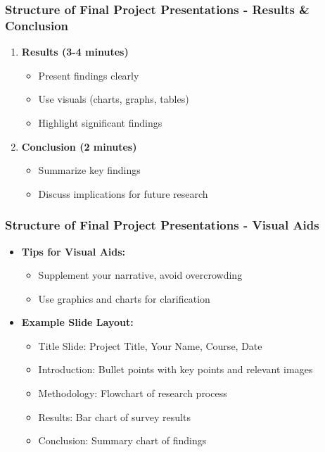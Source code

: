 \documentclass[aspectratio=169]{beamer}
\begin{document}
\begin{frame}[fragile]
    \frametitle{Structure of Final Project Presentations - Results & Conclusion}
    \begin{enumerate}[resume]
        \item \textbf{Results (3-4 minutes)}
            \begin{itemize}
                \item Present findings clearly
                \item Use visuals (charts, graphs, tables)
                \item Highlight significant findings
            \end{itemize}
        \item \textbf{Conclusion (2 minutes)}
            \begin{itemize}
                \item Summarize key findings
                \item Discuss implications for future research
            \end{itemize}
    \end{enumerate}
\end{frame}

\begin{frame}[fragile]
    \frametitle{Structure of Final Project Presentations - Visual Aids}
    \begin{itemize}
        \item \textbf{Tips for Visual Aids:}
            \begin{itemize}
                \item Supplement your narrative, avoid overcrowding
                \item Use graphics and charts for clarification
            \end{itemize}
        \item \textbf{Example Slide Layout:}
            \begin{itemize}
                \item Title Slide: Project Title, Your Name, Course, Date
                \item Introduction: Bullet points with key points and relevant images
                \item Methodology: Flowchart of research process
                \item Results: Bar chart of survey results
                \item Conclusion: Summary chart of findings
            \end{itemize}
    \end{itemize}
\end{frame}
\end{document}
